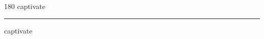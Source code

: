 
\begin{frame}
\begin{center}
\begin{turn}{180}
{\fontsize{2.5cm}{1em}\selectfont captivate}
\end{turn}
\vspace{1em}\par  
\hrule
\vspace{1em}\par  
{\fontsize{2.5cm}{1em}\selectfont captivate}
\end{center}
\end{frame}

